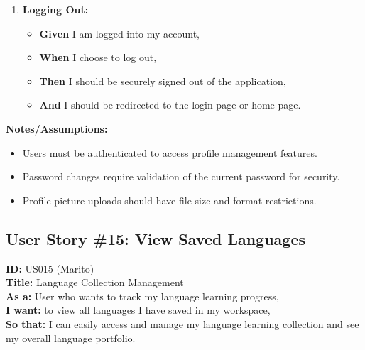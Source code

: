 \documentclass[12pt]{article}
\begin{document}
\begin{enumerate}
    \item \textbf{Logging Out:}
    \begin{itemize}
        \item \textbf{Given} I am logged into my account,
        \item \textbf{When} I choose to log out,
        \item \textbf{Then} I should be securely signed out of the application,
        \item \textbf{And} I should be redirected to the login page or home page.
    \end{itemize}
\end{enumerate}

\vspace{1em}
\textbf{Notes/Assumptions:}
\begin{itemize}
    \item Users must be authenticated to access profile management features.
    \item Password changes require validation of the current password for security.
    \item Profile picture uploads should have file size and format restrictions.
\end{itemize}


\subsection{User Story \#15: View Saved Languages}
\textbf{ID:} US015 (Marito) \\
\textbf{Title:} Language Collection Management \\
\textbf{As a:} User who wants to track my language learning progress, \\
\textbf{I want:} to view all languages I have saved in my workspace, \\
\textbf{So that:} I can easily access and manage my language learning collection and see my overall language portfolio.
\end{document}
